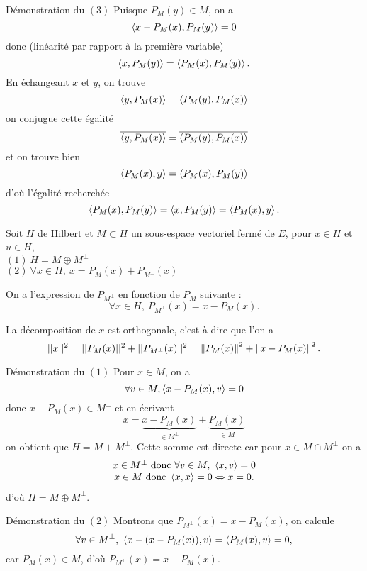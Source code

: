\documentclass[a4paper,11pt, twoside]{article}
\begin{document}
\begin{ProofC}{Démonstration du $(\mathit 3)$}
  Puisque $P_M(y)\in M$, on a 
  $$\left\langle x-P_M(x),P_M(y) \right\rangle=0$$
  donc (linéarité par rapport à la première variable)
  $$\left\langle x,P_M(y) \right\rangle=\left\langle P_M(x),P_M(y) \right\rangle.$$
  En échangeant $x$ et $y$, on trouve
  $$\left\langle y,P_M(x) \right\rangle=\left\langle P_M(y),P_M(x) \right\rangle$$
  on conjugue cette égalité
  $$\overline{\left\langle y,P_M(x) \right\rangle}=\overline{\left\langle P_M(y),P_M(x) \right\rangle}$$
  et on trouve bien 
  $$\left\langle P_M(x),y \right\rangle=\left\langle P_M(x),P_M(y) \right\rangle$$
  d'où l'égalité recherchée 
  $$\left\langle P_M(x),P_M(y) \right\rangle=\left\langle x,P_M(y) \right\rangle=\left\langle P_M(x),y \right\rangle.$$
\end{ProofC}


\begin{corollaire}
  Soit $H$ de Hilbert et $M\subset H$ un sous-espace vectoriel fermé de $E$, pour $x\in H$ et $u\in H$,\\
  
  $(\mathit 1)\ H=M\oplus M^\bot$\\
  $(\mathit 2)\ \forall x\in H,\ x=P_M(x)+P_{M^\bot}(x)$\\
\end{corollaire}


\begin{RQ}
  On a l'expression de $P_{M^\bot}$ en fonction de $P_M$ suivante :
  $$\forall x\in H,\ P_{M^\bot}(x)=x-P_M(x).$$
\end{RQ}

\begin{RQ}
  La décomposition de $x$ est orthogonale, c'est à dire que l'on a 
  $$||x||^2=||P_M(x)||^2+||P_{M^\bot}(x)||^2=\left\lVert P_M(x)\right\rVert^2+\left\lVert x-P_M(x)\right\rVert^2.$$
\end{RQ}


\begin{ProofC}{Démonstration du $(\mathit 1)$}
  Pour $x\in M$, on a 
  $$\forall v\in M, \left\langle x-P_M(x),v \right\rangle=0$$
  donc $x-P_M(x)\in M^\bot$ et en écrivant 
  $$x=\underbrace{x-P_M(x)}_{\in M^\bot}+\underbrace{P_M(x)}_{\in M}$$
  on obtient que $H=M+M^\bot.$ Cette somme est directe car pour $x\in M\cap M^\bot$ on a 
  $$\begin{array}{c}
    x\in M^\bot\text{ donc }\forall v\in M,\ \left\langle x,v \right\rangle=0\\
    x\in M\text{ donc }\left\langle x,x \right\rangle=0\Leftrightarrow x=0.
  \end{array}$$
  d'où $H=M\oplus M^\bot$.
\end{ProofC}


\begin{ProofC}{Démonstration du $(\mathit 2)$}
  Montrons que $P_{M^\bot}(x)=x-P_M(x)$, on calcule
  $$\forall v\in M^\bot,\ \ps{x-(x-P_M(x)),v}=\ps{P_M(x),v}=0,$$
  car $P_M(x)\in M$, d'où $P_{M^\bot}(x)=x-P_M(x)$.
\end{ProofC}
\end{document}
